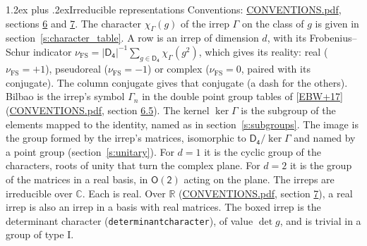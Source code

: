 \documentclass[10pt,a4paper]{article}
\makeatletter
\renewcommand\section{\@startsection{section}{1}{\z@}{-3ex plus -1ex minus -.2ex}%
  {1.2ex plus .2ex}{\normalfont\large\sffamily\bfseries\color{parttitle}}}
\numberwithin{equation}{section}
\newcommand{\grp}[1]{\mathsf{#1}}
\newcommand{\irchar}[1]{\chi_{#1}}
\newcommand{\fsind}{\nu_{\mathrm{FS}}}
\makeatother
\begin{document}
\section{Irreducible representations}\label{s:irreps}
Conventions: \href{../../CONVENTIONS.pdf}{CONVENTIONS.pdf}, sections \href{../../CONVENTIONS.pdf\#conv.6}{6} and \href{../../CONVENTIONS.pdf\#conv.7}{7}.
\leavevmode\label{n:function.character}\label{n:irrep.Gamma}The character $\irchar{\Gamma}(g)$ of the irrep $\Gamma$ on the class of $g$ is given in section~\ref{s:character_table}.
\leavevmode\label{n:index.dimension}\label{n:index.frobenius}\label{n:head.irrep}\label{n:head.reality}A row is an irrep of dimension $d$, with its Frobenius--Schur indicator $\fsind = |\grp{D_{4}}|^{-1}\allowbreak\sum_{g\in\grp{D_{4}}}\irchar{\Gamma}(g^2)$, which gives its reality: real ($\fsind = +1$), pseudoreal ($\fsind = -1$) or complex ($\fsind = 0$, paired with its conjugate). \label{n:head.conjugate}The column conjugate gives that conjugate (a dash for the others). \label{n:head.bilbao}\label{n:irrep.alias.gamma}Bilbao is the irrep's symbol $\Gamma_n$ in the double point group tables of [\href{../../../REFERENCES.pdf\#ref.EBW+17}{EBW+17}] (\href{../../CONVENTIONS.pdf}{CONVENTIONS.pdf}, section \href{../../CONVENTIONS.pdf\#conv.6.5}{6.5}). \label{n:head.kernel}The kernel $\ker\Gamma$ is the subgroup of the elements mapped to the identity, named as in section~\ref{s:subgroups}. \label{n:head.image}The image is the group formed by the irrep's matrices, isomorphic to $\grp{D_{4}}/\ker\Gamma$ and named by a point group (section~\ref{s:unitary}). For $d = 1$ it is the cyclic group of the characters, roots of unity that turn the complex plane. For $d = 2$ it is the group of the matrices in a real basis, in $\grp{O(2)}$ acting on the plane. The irreps are irreducible over $\mathbb{C}$. Each is real. Over $\mathbb{R}$ (\href{../../CONVENTIONS.pdf}{CONVENTIONS.pdf}, section \href{../../CONVENTIONS.pdf\#conv.7}{7}), a real irrep is also an irrep in a basis with real matrices. \label{n:mark.determinant}The boxed irrep is the determinant character (\texttt{determinantcharacter}), of value $\det g$, and is trivial in a group of type I.
\setlength{\emergencystretch}{2em}\par\setlength{\emergencystretch}{0pt}
\end{document}
